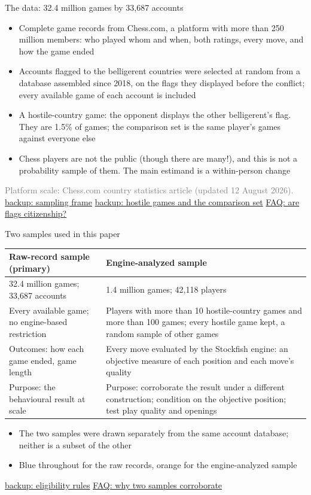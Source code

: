 \documentclass[aspectratio=169,11pt,t]{beamer}
\newcommand{\bk}[2]{\hyperlink{#1}{\textcolor{linkblue}{\scriptsize\textsf{backup: #2}}}}
\newcommand{\fq}[2]{\hyperlink{#1}{\textcolor{linkblue}{\scriptsize\textsf{FAQ: #2}}}}
\newcommand{\links}[1]{\vfill\hfill{#1}}
\newcommand{\src}[1]{{\vfill\scriptsize\textcolor{gray}{#1}}}
\begin{document}
\begin{frame}[label=records]{The data: 32.4 million games by 33,687 accounts}
  \small
  \begin{itemize}
    \item Complete game records from Chess.com, a platform with more than 250 million members: who played whom and when, both ratings, every move, and how the game ended
    \item Accounts flagged to the belligerent countries were selected at random from a database assembled since 2018, on the flags they displayed before the conflict; every available game of each account is included
    \item A hostile-country game: the opponent displays the other belligerent's flag. They are 1.5\% of games; the comparison set is the same player's games against everyone else
    \item Chess players are not the public (though there are many!), and this is not a probability sample of them. The main estimand is a within-person change
  \end{itemize}
  \src{Platform scale: Chess.com country statistics article (updated 12 August 2026).}
  \links{\bk{bk-frame}{sampling frame} \quad \bk{bk-hostile}{hostile games and the comparison set} \quad \fq{faq-flags}{are flags citizenship?}}
\end{frame}

\begin{frame}[label=samples]{Two samples used in this paper}
  \small
  \begin{tabular}{@{}p{}p{}@{}}
    \textcolor{rawblue}{\textbf{Raw-record sample (primary)}} & \textcolor{engorange}{\textbf{Engine-analyzed sample}} \\
    \midrule
    32.4 million games; 33,687 accounts & 1.4 million games; 42,118 players \\[2mm]
    Every available game; no engine-based restriction & Players with more than 10 hostile-country games and more than 100 games; every hostile game kept, a random sample of other games \\[2mm]
    Outcomes: how each game ended, game length & Every move evaluated by the Stockfish engine: an objective measure of each position and each move's quality \\[2mm]
    Purpose: the behavioural result at scale & Purpose: corroborate the result under a different construction; condition on the objective position; test play quality and openings \\
  \end{tabular}
  \vspace{3mm}
  \begin{itemize}
    \item The two samples were drawn separately from the same account database; neither is a subset of the other
    \item Blue throughout for the raw records, orange for the engine-analyzed sample
  \end{itemize}
  \links{\bk{bk-eligibility}{eligibility rules} \quad \fq{faq-independent}{why two samples corroborate}}
\end{frame}
\end{document}
